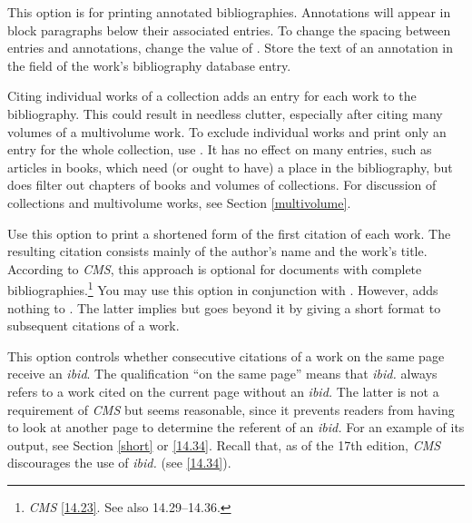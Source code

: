 \documentclass[11pt,letterpaper,oneside]{article}
\begin{document}
\begin{optionlist}


\noindent This option is for printing annotated bibliographies.
Annotations will appear in block paragraphs below their associated
entries. To change the spacing between entries and annotations, change
the value of . Store the text of an annotation in the
 field of the work's bibliography database entry.


\noindent Citing individual works of a collection adds an entry for
each work to the bibliography. This could result in needless clutter,
especially after citing many volumes of a multivolume work. To exclude
individual works and print only an entry for the whole collection, use
. It has no effect on many 
entries, such as articles in books, which need (or ought to have) a
place in the bibliography, but does filter out chapters of books and
volumes of collections. For discussion of collections and multivolume
works, see Section \ref{multivolume}.


\noindent Use this option to print a shortened form of the first
citation of each work. The resulting citation consists mainly of the
author's name and the work's title. According to \textit{CMS}, this
approach is optional for documents with complete
bibliographies.\footnote{\textit{CMS} \ref{14.23}. See also
14.29--14.36.} You may use this option in conjunction with .
However,  adds nothing to . The latter
implies  but goes beyond it by giving a short format
to subsequent citations of a work.


\noindent This option controls whether consecutive citations of a work
on the same page receive an \textit{ibid}. The qualification ``on the
same page'' means that \textit{ibid.} always refers to a work cited on
the current page without an \textit{ibid.} The latter is not a
requirement of \textit{CMS} but seems reasonable, since it prevents
readers from having to look at another page to determine the referent
of an \textit{ibid.} For an example of its output, see Section
\ref{short} or \ref{14.34}. Recall that, as of the 17th edition,
\textit{CMS} discourages the use of \textit{ibid.} (see \ref{14.34}).


\end{optionlist}
\end{document}
